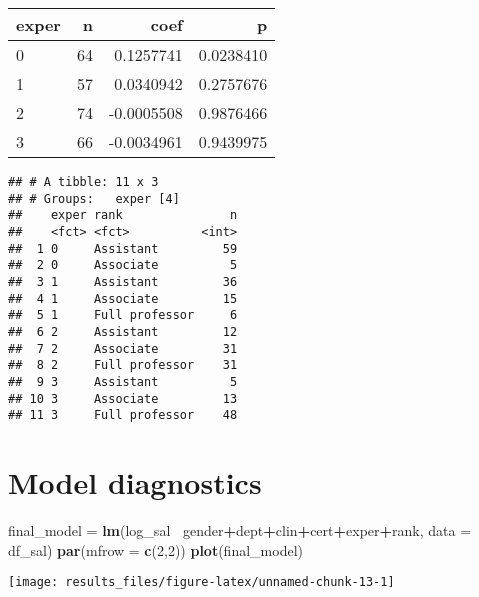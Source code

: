 \documentclass[]{article}
\newenvironment{Shaded}{\begin{snugshade}}{\end{snugshade}}
\newcommand{\DataTypeTok}[1]{\textcolor[rgb]{0.13,0.29,0.53}{#1}}
\newcommand{\DecValTok}[1]{\textcolor[rgb]{0.00,0.00,0.81}{#1}}
\newcommand{\KeywordTok}[1]{\textcolor[rgb]{0.13,0.29,0.53}{\textbf{#1}}}
\newcommand{\NormalTok}[1]{#1}
\newcommand{\OperatorTok}[1]{\textcolor[rgb]{0.81,0.36,0.00}{\textbf{#1}}}
\newcommand{\StringTok}[1]{\textcolor[rgb]{0.31,0.60,0.02}{#1}}
\begin{document}
\begin{longtable}[]{@{}lrrr@{}}
\toprule
exper & n & coef & p\tabularnewline
\midrule
\endhead
0 & 64 & 0.1257741 & 0.0238410\tabularnewline
1 & 57 & 0.0340942 & 0.2757676\tabularnewline
2 & 74 & -0.0005508 & 0.9876466\tabularnewline
3 & 66 & -0.0034961 & 0.9439975\tabularnewline
\bottomrule
\end{longtable}

\begin{Shaded}
\end{Shaded}

\begin{verbatim}
## # A tibble: 11 x 3
## # Groups:   exper [4]
##    exper rank               n
##    <fct> <fct>          <int>
##  1 0     Assistant         59
##  2 0     Associate          5
##  3 1     Assistant         36
##  4 1     Associate         15
##  5 1     Full professor     6
##  6 2     Assistant         12
##  7 2     Associate         31
##  8 2     Full professor    31
##  9 3     Assistant          5
## 10 3     Associate         13
## 11 3     Full professor    48
\end{verbatim}

\hypertarget{model-diagnostics}{%
\section{Model diagnostics}\label{model-diagnostics}}

\begin{Shaded}
\begin{Highlighting}[]
\NormalTok{final_model =}\StringTok{ }\KeywordTok{lm}\NormalTok{(log_sal }\OperatorTok{~}\NormalTok{gender}\OperatorTok{+}\NormalTok{dept}\OperatorTok{+}\NormalTok{clin}\OperatorTok{+}\NormalTok{cert}\OperatorTok{+}\NormalTok{exper}\OperatorTok{+}\NormalTok{rank, }\DataTypeTok{data =}\NormalTok{ df_sal)}
\KeywordTok{par}\NormalTok{(}\DataTypeTok{mfrow =} \KeywordTok{c}\NormalTok{(}\DecValTok{2}\NormalTok{,}\DecValTok{2}\NormalTok{))}
\KeywordTok{plot}\NormalTok{(final_model)}
\end{Highlighting}
\end{Shaded}

\texttt{[image: results\_files/figure-latex/unnamed-chunk-13-1]}
\end{document}
